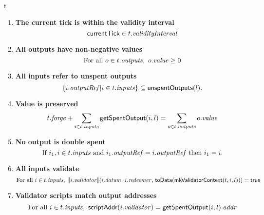 \begin{ruledfigure}{t}
\begin{enumerate}

\item
  \label{rule:slot-in-range}
  \textbf{The current tick is within the validity interval}
  \begin{displaymath}
    \mathsf{currentTick} \in t.\textit{validityInterval}
  \end{displaymath}

\item
  \label{rule:all-outputs-are-non-negative}
  \textbf{All outputs have non-negative values}
  \begin{displaymath}
    \textrm{For all } o \in t.\mathit{outputs},\ o.\mathit{value} \geq 0
  \end{displaymath}

\item
  \label{rule:all-inputs-refer-to-unspent-outputs}
  \textbf{All inputs refer to unspent outputs}
  \begin{displaymath}
    \{i.\mathit{outputRef} | i \in t.\mathit{inputs} \} \subseteq \mathsf{unspentOutputs}(l).
  \end{displaymath}

\item
  \label{rule:value-is-preserved}
  \textbf{Value is preserved}
  \begin{displaymath}
    t.\mathit{forge} + \sum_{i \in t.\mathit{inputs}} \mathsf{getSpentOutput}(i, l) = \sum_{o \in t.\mathit{outputs}} o.\mathit{value}
  \end{displaymath}

\item
  \label{rule:no-double-spending}
  \textbf{No output is double spent}
  \begin{displaymath}
    \textrm{If } i_1, i \in t.\mathit{inputs} \textrm{ and }  i_1.\mathit{outputRef} = i.\mathit{outputRef}
    \textrm{ then } i_1 = i.
  \end{displaymath}

\item
  \label{rule:all-inputs-validate}
  \textbf{All inputs validate}
  \begin{displaymath}
    \textrm{For all } i \in t.\mathit{inputs},\ \llbracket i.\mathit{validator}\rrbracket(i.\mathit{datum},\, i.\mathit{redeemer},\, \textsf{toData}(\textsf{mkValidatorContext}(t, i, l))) = \mathsf{true}
  \end{displaymath}

\item
  \label{rule:validator-scripts-hash}
  \textbf{Validator scripts match output addresses}
  \begin{displaymath}
    \textrm{For all } i \in t.\mathit{inputs},\ \mathsf{scriptAddr}(i.\mathit{validator}) = \mathsf{getSpentOutput}(i, l).\mathit{addr}
  \end{displaymath}


\end{enumerate}
\end{ruledfigure}
